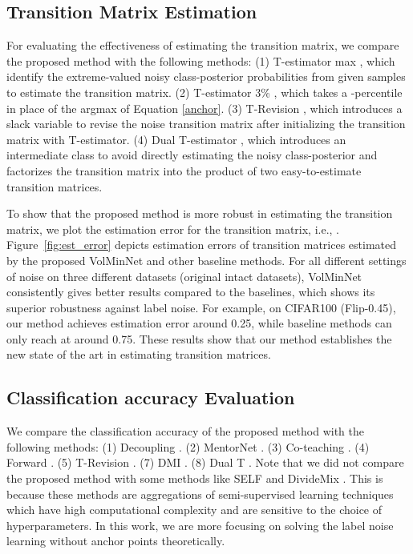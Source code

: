 \documentclass{article}
\begin{document}
\subsection{Transition Matrix Estimation} \label{exp:est}
For evaluating the effectiveness of estimating the transition matrix, we compare the proposed method with the following methods: (1) T-estimator max \cite{patrini2017making}, which identify the extreme-valued noisy class-posterior probabilities from given samples to estimate the transition matrix. (2) T-estimator 3\% \cite{patrini2017making}, which takes a -percentile in place of the argmax of Equation \ref{anchor}.
(3) T-Revision \cite{xia2019anchor}, which introduces a slack variable to revise the noise transition matrix after initializing the transition matrix with T-estimator. (4) Dual T-estimator \cite{yao2020dual}, which introduces an intermediate class to avoid directly estimating the noisy class-posterior and factorizes the transition matrix into the product of two easy-to-estimate transition matrices.



To show that the proposed method is more robust in estimating the transition matrix, we plot the estimation error for the transition matrix, i.e., . Figure~\ref{fig:est_error} depicts estimation errors of transition matrices estimated by the proposed VolMinNet and other baseline methods. For all different settings of noise on three different datasets (original intact datasets), VolMinNet consistently gives better results compared to the baselines, which shows its superior robustness against label noise. For example, on CIFAR100 (Flip-0.45), our method achieves estimation error around 0.25, while baseline methods can only reach at around 0.75. These results show that our method establishes the new state of the art in estimating transition matrices. 





\subsection{Classification accuracy Evaluation}


We compare the classification accuracy of the proposed method with the following methods: (1) Decoupling \cite{malach2017decoupling}. (2) MentorNet \cite{jiang2018mentornet}. (3) Co-teaching \cite{han2018co}. (4) Forward \cite{patrini2017making}. (5) T-Revision \cite{xia2019anchor}. (7) DMI \cite{xu2019l_dmi}. (8) Dual T \cite{yao2020dual}. Note that we did not compare the proposed method with some methods like SELF \cite{nguyen2019self} and DivideMix \cite{li2019dividemix}. This is because these methods are aggregations of semi-supervised learning techniques which have high computational complexity and are sensitive to the choice of hyperparameters. In this work, we are more focusing on solving the label noise learning without anchor points theoretically.
\end{document}
